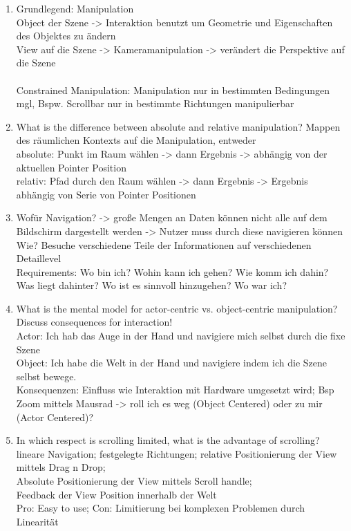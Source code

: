 \begin{enumerate}
	\item Grundlegend: Manipulation\\
	Object der Szene -> Interaktion benutzt um Geometrie und Eigenschaften des Objektes zu ändern\\
	View auf die Szene -> Kameramanipulation -> verändert die Perspektive auf die Szene\\
	\\
	Constrained Manipulation: Manipulation nur in bestimmten Bedingungen mgl, Bspw. Scrollbar nur in bestimmte Richtungen manipulierbar
	
	\item What is the difference between absolute and relative manipulation?
	Mappen des räumlichen Kontexts auf die Manipulation, entweder \\
	absolute: Punkt im Raum wählen -> dann Ergebnis -> abhängig von der aktuellen Pointer Position\\
	relativ: Pfad durch den Raum wählen -> dann Ergebnis -> Ergebnis abhängig von Serie von Pointer Positionen
	
	\item Wofür Navigation? -> große Mengen an Daten können nicht alle auf dem Bildschirm dargestellt werden -> Nutzer muss durch diese navigieren können\\
	Wie? Besuche verschiedene Teile der Informationen auf verschiedenen Detaillevel\\
	Requirements: Wo bin ich? Wohin kann ich gehen? Wie komm ich dahin? Was liegt dahinter? Wo ist es sinnvoll hinzugehen? Wo war ich?
	
	\item What is the mental model for actor-centric vs. object-centric manipulation? Discuss consequences for interaction!\\
	Actor: Ich hab das Auge in der Hand und navigiere mich selbst durch die fixe Szene\\
	Object: Ich habe die Welt in der Hand und navigiere indem ich die Szene selbst bewege.\\
	Konsequenzen: Einfluss wie Interaktion mit Hardware umgesetzt wird; Bsp Zoom mittels Mausrad -> roll ich es weg (Object Centered) oder zu mir (Actor Centered)?
	
	\item In which respect is scrolling limited, what is the advantage of scrolling?\\
	lineare Navigation; festgelegte Richtungen; relative Positionierung der View mittels Drag n Drop;\\
	Absolute Positionierung der View mittels Scroll handle;\\
	Feedback der View Position innerhalb der Welt\\
	Pro: Easy to use; Con: Limitierung bei komplexen Problemen durch Linearität
	

\end{enumerate}
